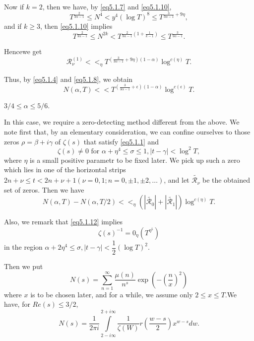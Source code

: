Now if $k = 2$, then we have, by \eqref{eq5.1.7} and \eqref{eq5.1.10},
$$
T^{\frac{2}{3\alpha - 1}} \leq N^4 < y^4 (\log T)^8 \leq
T^{\frac{3}{3\alpha - 1} + 9 \eta}, 
$$
and if $k \geq 3$, then \eqref{eq5.1.10} implies
$$
T^{\frac{2}{3 \alpha -1}} \leq N^{2k} < T^{\frac{2}{3 \alpha -1}\left(1+
  \frac{1}{k-1}\right)}  \leq  T^{\frac{3}{3 \alpha-1}}. 
$$

Hence\pageoriginale we get 
$$
\mathscr{R}^{(1)}_{\nu} <<_{\eta} T^{\left(\frac{3}{3 \alpha-1} + 9 \eta\right)
  (1-\alpha)} \log^{c (\eta)}T. 
$$

Thus, by \eqref{eq5.1.4} and \eqref{eq5.1.8}, we obtain
\begin{equation*}
N(\alpha, T) << T^{\left(\frac{3}{3 \alpha -1} + \epsilon  \right) (1-\alpha )}
\log^{c(\epsilon  )}T. \tag{5.1.11} \label{eq5.1.11}
\end{equation*}

\begin{Case}\label{chap5-case3}%
$3/4 \leq \alpha \leq 5/6$.
\end{Case}

In this case, we require a zero-detecting method different from the
above. We note first that, by an elementary consideration, we can
confine ourselves to those zeros $\rho = \beta + i \gamma$ of $\zeta
(s)$ that satisfy \eqref{eq5.1.1} and  
\begin{equation*}
  \zeta (s) \neq 0 \text{ for } \alpha + \eta^4 \leq \sigma \leq 1, |
  t- \gamma | < \log^2 T, \tag{5.1.12} \label{eq5.1.12}
\end{equation*}
where $\eta$ is a small positive parametr to be fixed later. We pick
up such a zero which lies in one of the horizontal strips $ 2n + \nu
\leq t< 2n + \nu +1 (\nu = 0,1; n = 0, \pm 1, \pm 2, \ldots)$, and let
$\tilde{\mathscr{R}_{\nu}}$ be the obtained set of zeros. Then we have  
$$
N(\alpha,T) - N(\alpha,  T/2) <<_{\eta}( | \tilde{\mathscr{R}_{0}} | +
| \tilde{\mathscr{R}_{1}} | ) \log^{c(\eta)}T. 
$$

Also, we remark that \eqref{eq5.1.12} implies 
\begin{equation*}
  \zeta (s)^{-1} = 0_{\eta}(T^{\eta^5}) \tag{5.1.13}\label{eq5.1.13}
\end{equation*}
in the region $\alpha + 2 \eta^4 \leq \sigma,  | t- \gamma | <
\dfrac{1}{2}(\log T)^2$. 

Then we put 
$$
N(s) = \sum^{\infty}_{n=1} \frac{\mu (n)}{n^s} \exp
\left(-\left(\frac{n}{x}\right)^2\right) 
$$
where $x$ is to be chosen later, and for a while, we assume only $2
\leq x \leq T$.\pageoriginale We have, for $Re(s) \leq 3/2$, 
$$
N(s) = \frac{1}{2 \pi i} \int \limits^{2 + i \infty}_{2- i \infty} 
\frac{1}{\zeta(W)} r \left( \frac{w-s}{2}\right) x^{w-s} dw.  
$$

